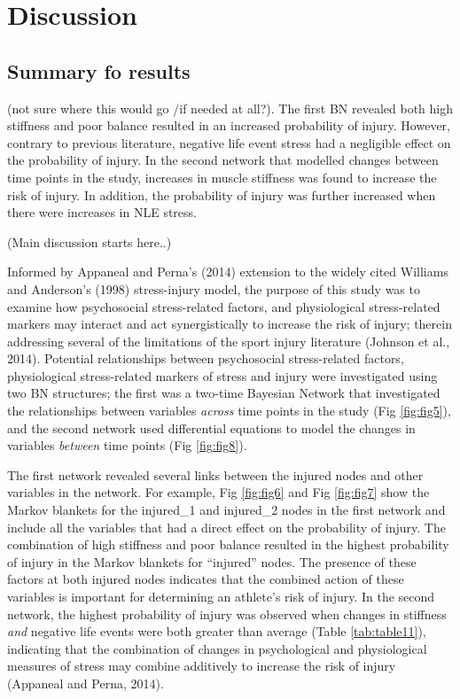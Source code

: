 \documentclass[
  english,
  man]{apa6}
\begin{document}
\hypertarget{discussion}{%
\section{Discussion}\label{discussion}}

\hypertarget{summary-fo-results}{%
\subsection{Summary fo results}\label{summary-fo-results}}

(not sure where this would go /if needed at all?). The first BN revealed both high stiffness and poor balance resulted in an increased probability of injury. However, contrary to previous literature, negative life event stress had a negligible effect on the probability of injury.
In the second network that modelled changes between time points in the study, increases in muscle stiffness was found to increase the risk of injury. In addition, the probability of injury was further increased when there were increases in NLE stress.

(Main discussion starts here..)

Informed by Appaneal and Perna's (2014) extension to the widely cited Williams and Anderson's (1998) stress-injury model, the purpose of this study was to examine how psychosocial stress-related factors, and physiological stress-related markers may interact and act synergistically to increase the risk of injury; therein addressing several of the limitations of the sport injury literature (Johnson et al., 2014).
Potential relationships between psychosocial stress-related factors, physiological stress-related markers of stress and injury were investigated using two BN structures; the first was a two-time Bayesian Network that investigated the relationships between variables \emph{across} time points in the study (Fig \ref{fig:fig5}), and the second network used differential equations to model the changes in variables \emph{between} time points (Fig \ref{fig:fig8}).

The first network revealed several links between the injured nodes and other variables in the network.
For example, Fig \ref{fig:fig6} and Fig \ref{fig:fig7} show the Markov blankets for the injured\_1 and injured\_2 nodes in the first network and include all the variables that had a direct effect on the probability of injury.
The combination of high stiffness and poor balance resulted in the highest probability of injury in the Markov blankets for ``injured'' nodes.
The presence of these factors at both injured nodes indicates that the combined action of these variables is important for determining an athlete's risk of injury.
In the second network, the highest probability of injury was observed when changes in stiffness \emph{and} negative life events were both greater than average (Table \ref{tab:table11}), indicating that the combination of changes in psychological and physiological measures of stress may combine additively to increase the risk of injury (Appaneal and Perna, 2014).
\end{document}

